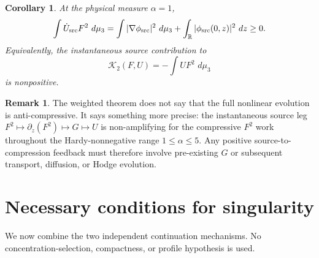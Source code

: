 \documentclass[11pt]{article}
\numberwithin{equation}{section}
\newtheorem{corollary}[corollary]{Corollary}
\theoremstyle{definition}
\newtheorem{remark}[remark]{Remark}
\newcommand{\R}{\mathbb R}
\newcommand{\dd}{\,d}
\begin{document}
\begin{corollary}\label{prop:antisource}
At the physical measure $\alpha=1$,
\begin{equation}\label{eq:antisource}
 \int \dot U_{\rm src}F^2\,\dd\mu_3
 =\int |\nabla\phi_{\rm src}|^2\,\dd\mu_3
 +\int_\R|\phi_{\rm src}(0,z)|^2\,\dd z
 \ge0.
\end{equation}
Equivalently, the instantaneous source contribution to
\[
 \mathcal K_2(F,U)=-\int UF^2\,\dd\mu_3
\]
is nonpositive.
\end{corollary}

\begin{remark}
The weighted theorem does not say that the full nonlinear evolution is anti-compressive.  It says something more precise: the instantaneous source leg $F^2\mapsto\partial_z(F^2)\mapsto G\mapsto U$ is non-amplifying for the compressive $F^2$ work throughout the Hardy-nonnegative range $1\le\alpha\le5$.  Any positive source-to-compression feedback must therefore involve pre-existing $G$ or subsequent transport, diffusion, or Hodge evolution.
\end{remark}

\section{Necessary conditions for singularity}

We now combine the two independent continuation mechanisms.  No concentration-selection, compactness, or profile hypothesis is used.
\end{document}
